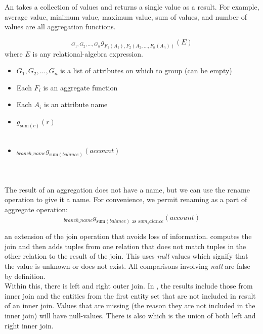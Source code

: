 \documentclass{article}
\begin{document}
An  takes a collection of values and returns a single value as a result. For example, average value, minimum value, maximum value, sum of values, and number of values are all aggregation functions. 

\begin{definition}
  $$_{G_1 , G_2, \dots , G_n}g_{F_1(A_1), F_2(A_2 , \dots , F_n(A_n))}(E)$$ where $E$ is any relational-algebra expression. 
  \begin{itemize}
    \item $G_1 , G_2 , \dots , G_n$ is a list of attributes on which to group (can be empty) 
    \item Each $F_i$ is an aggregate function 
    \item Each $A_i$ is an attribute name
  \end{itemize}
\end{definition}

\begin{example}
  \begin{itemize}
    \item $g_{\textrm{sum}(c)}(r)$ \\ 
       \\ 
    \item $_{branch\_name}g_{\textrm{sum}(balance)}(account)$ \\ 
       \\ 
       \\
  \end{itemize}
\end{example}

The result of an aggregation does not have a name, but we can use the rename operation to give it a name. For convenience, we permit renaming as a part of aggregate operation: $$_{branch\_name}g_{\textrm{sum}(balance) \textrm{ as }sum_balance}(account)$$

\begin{definition}
  an extension of the join operation that avoids loss of information.  computes the join and then adds tuples from one relation that does not match tuples in the other relation to the result of the join. This uses \emph{null} values which signify that the value is unknown or does not exist. All comparisons involving \emph{null} are false by definition. \\ 

  Within this, there is left and right outer join. In , the results include those from inner join and the entities from the first entity set that are not included in result of an inner join. Values that are missing (the reason they are not included in the inner join) will have null-values. There is also  which is the union of both left and right inner join. 
\end{definition}
\end{document}
